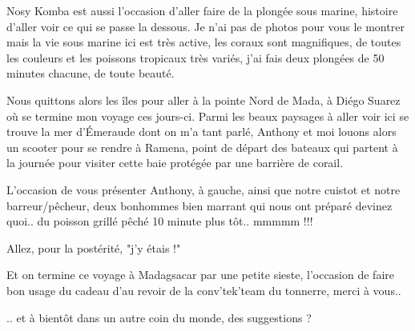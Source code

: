 \begin{multicols}{2}
Nosy Komba est aussi l'occasion d'aller faire de la plongée sous marine, histoire d'aller voir ce qui se passe la dessous. Je n'ai pas de photos pour vous le montrer mais la vie sous marine ici est très active, les coraux sont magnifiques, de toutes les couleurs et les poissons tropicaux très variés, j'ai fais deux plongées de 50 minutes chacune, de toute beauté.

Nous quittons alors les îles pour aller à la pointe Nord de Mada, à Diégo Suarez où se termine mon voyage ces jours-ci. Parmi les beaux paysages à aller voir ici se trouve la mer d'Émeraude dont on m'a tant parlé, Anthony et moi louons alors un scooter pour se rendre à Ramena, point de départ des bateaux qui partent à la journée pour visiter cette baie protégée par une barrière de corail.

L'occasion de vous présenter Anthony, à gauche, ainsi que notre cuistot et notre barreur/pêcheur, deux bonhommes bien marrant qui nous ont préparé devinez quoi.. du poisson grillé pêché 10 minute plus tôt.. mmmmm !!!


Allez, pour la postérité, "j'y étais !"


Et on termine ce voyage à Madagsacar par une petite sieste, l'occasion de faire bon usage du cadeau d'au revoir de la conv'tek'team du tonnerre, merci à vous..


.. et à bientôt dans un autre coin du monde, des suggestions ?

\end{multicols}
